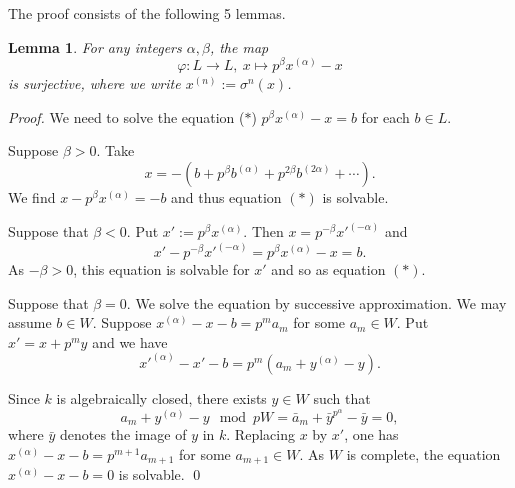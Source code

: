 \documentclass[]{amsart}
\theoremstyle{plain}
\newtheorem{lemma}[thm]{Lemma}
\theoremstyle{definition}
\theoremstyle{remark}
\newcommand{\<}{\langle}   %
\renewcommand{\>}{\rangle} %
\begin{document}
The proof consists of the following 5 lemmas.

\begin{lemma}\label{lm:4.0}
  For any integers $\alpha, \beta$, the map
  \[ \varphi: L \to L, \ x\mapsto p^\beta x^{(\alpha)} -x \]
  is surjective, where we write $x^{(n)}:=\sigma^n(x)$.
\end{lemma}
\begin{proof}
   We need to solve the equation ($*$) $p^\beta x^{(\alpha)} -x =b$ for each $b\in L$. 

   Suppose $\beta>0$. Take
   \[ x=-(b+ p^\beta b^{(\alpha)} + p^{2\beta} b^{(2\alpha)}+\cdots) .\]
   We find $x-p^\beta x^{(\alpha)}=-b$ and thus equation $(*)$ is solvable.

   Suppose that $\beta<0$. Put $x':=p^\beta x^{(\alpha)}$. Then $x=p^{-\beta} x'^{(-\alpha)}$ and 
   \[ x'- p^{-\beta} x'^{(-\alpha)}=p^\beta x^{(\alpha)}-x=b.\]
   As $-\beta>0$, this equation is solvable for $x'$ and so as equation $(*)$. 
   

   Suppose that $\beta=0$. We solve the equation by successive approximation. We may assume $b\in W$. Suppose $x^{(\alpha)}-x-b =p^m a_m$ for some $a_m\in W$. Put $x'=x+p^m y$ and we have 
   \[ x'^{(\alpha)}-x'-b =p^m (a_m+y^{(\alpha)}-y). \]
   
   Since $k$ is algebraically closed, there exists $y\in W$ such that \[ a_m+y^{(\alpha)}-y\!\!\! \mod {pW} = \bar a_m+\bar y^{p^\alpha}-\bar y=0, \] 
   where $\bar y$ denotes the image of $y$ in $k$.
   Replacing $x$ by $x'$, one has $x^{(\alpha)}-x-b =p^{m+1} a_{m+1}$ for some $a_{m+1}\in W$. As $W$ is complete, the equation $x^{(\alpha)}-x-b=0$ is solvable. \qed 
\end{proof}
\end{document}
